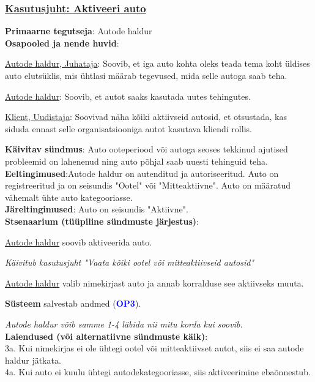 \begin{shaded}
	\subsubsection{\underline{Kasutusjuht: Aktiveeri auto}}
	\textbf{Primaarne tegutseja}: Autode haldur \\
	\textbf{Osapooled ja nende huvid}: 
	\useDash
	\begin{myitemize}
		\item \underline{Autode haldur, Juhataja}: Soovib, et iga auto kohta oleks teada tema koht üldises auto elutsüklis, mis ühtlasi määrab tegevused, mida selle autoga saab teha.
		\item \underline{Autode haldur}: Soovib, et autot saaks kasutada uutes tehingutes.
		\item \underline{Klient, Uudistaja}: Soovivad näha kõiki aktiivseid autosid, et otsustada, kas siduda ennast selle organisatsiooniga autot kasutava kliendi rollis.
	\end{myitemize}
	\textbf{Käivitav sündmus}: Auto ooteperiood või autoga seoses tekkinud ajutised probleemid on lahenenud ning auto põhjal saab uuesti tehinguid teha. \\
	\textbf{Eeltingimused}:Autode haldur on autenditud ja autoriseeritud. Auto on registreeritud ja on seisundis "Ootel" või "Mitteaktiivne". Auto on määratud vähemalt ühte auto kategooriasse.\\
	\textbf{Järeltingimused}: Auto on seisundis "Aktiivne". \\
	\textbf{Stsenaarium (tüüpiline sündmuste järjestus)}:
	\begin{myenumerate}
		\item \underline{Autode haldur} soovib aktiveerida auto.
		\item\textit{ Käivitub kasutusjuht "Vaata kõiki ootel või mitteaktiivseid autosid"}
		\item \underline{Autode haldur} valib nimekirjast auto ja annab korralduse see aktiivseks muuta.
		\item \textbf{Süsteem} salvestab andmed (\textbf{\textcolor{blue}{OP3}}).
	\end{myenumerate}
	\textit{Autode haldur võib samme 1-4 läbida nii mitu korda kui soovib.} \\
	\textbf{Laiendused  (või alternatiivne sündmuste käik)}: \\
	\indent 3a. Kui nimekirjas ei ole ühtegi ootel või mitteaktiivset autot, siis ei saa autode haldur jätkata. \\
	\indent 4a. Kui auto ei kuulu ühtegi autodekategooriasse, siis aktiveerimine ebaõnnestub.
\end{shaded}

